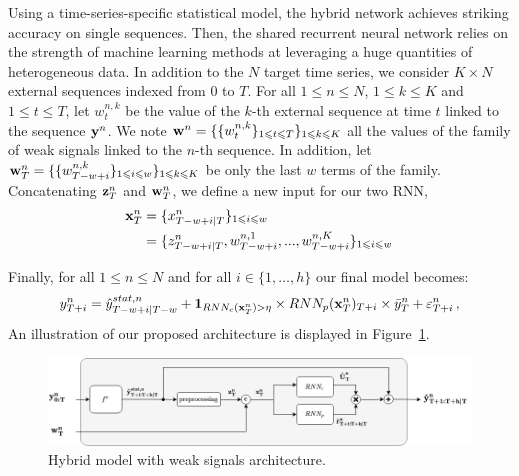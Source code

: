 \documentclass{article} %
\newcommand{\ts}{y}
\newcommand{\fullts}{{\bf \ts}}
\newcommand{\tspred}{\hat{\ts}}
\newcommand{\lag}{h}
\newcommand{\window}{w}
\newcommand{\meants}{\Bar{\ts}}
\newcommand{\rnnwindow}{{\bf \rnn}}
\newcommand{\rnn}{z}
\newcommand{\rnnmodel}{\textsc{rnn}}
\newcommand{\ws}{w}
\newcommand{\fullws}{{\bf \ws}}
\newcommand{\concatinput}{x}
\newcommand{\fullconcatinput}{{ \bf \concatinput}}
\newcommand{\threshold}{\eta}
\newcommand{\predictor}{RNN_p}
\newcommand{\classifier}{RNN_c}
\begin{document}
Using a time-series-specific statistical model, the hybrid network achieves striking accuracy on single sequences. Then, the shared recurrent neural network relies on the strength of machine learning methods at leveraging a huge quantities of heterogeneous data.
In addition to the $N$ target time series, we consider $K \times N$ external sequences indexed from $0$ to $T$. For all $1\leqslant n \leqslant N$, $1\leqslant k \leqslant K$ and  $1\leqslant t \leqslant T$, let $\ws^{n,k}_t$ be the value of the $k$-th external sequence at time $t$ linked to the sequence $\fullts^n$. We note $\fullws^n = \{\{\ws_t^{n,k}\}_{1\leqslant t \leqslant T}\}_{1\leqslant k \leqslant K}$ all the values of the family of weak signals linked to the $n$-th sequence. In addition, let $\fullws^n_T = \{\{\ws_{T-w+i}^{n,k}\}_{1\leqslant i \leqslant \window}\}_{1\leqslant k \leqslant K}$ be only the last $\window$ terms of the family. Concatenating $ \rnnwindow^n_T$ and $\fullws^n_T$, we define a new input for our two RNN,   
\begin{align*}
\fullconcatinput^n_T &= \{\concatinput^n_{T-w+i|T}\}_{1\leqslant i \leqslant w}\, \\
&= \{\rnn^n_{T-w+i|T}, \ws^{n,1}_{T-w+i},...,\ws^{n,K}_{T-w+i}\}_{1\leqslant i \leqslant w}\,
\end{align*}

Finally, for all $1\leqslant n \leqslant N$ and for all $i \in \{1,\ldots,\lag\}$ our final model becomes:
\begin{equation}
\label{eq:full:model}
\ts^n_{T+i}  = \tspred^{stat,n}_{T-w+i|T-w} +  \mathbf{1}_{\classifier(\fullconcatinput^n_T) > \threshold} \times \predictor(\fullconcatinput^n_T)_{T+i} \times \meants^n_T + \varepsilon^n_{T+i}\,,
\end{equation}
An illustration of our proposed architecture is displayed in Figure~\ref{fig:architecture}.

\begin{figure}
  \centering
    \includegraphics[width=1.2\linewidth]{figure/Regime_switching_recurrent_model}
  \caption{Hybrid model with weak signals architecture.}
\label{fig:architecture}
\end{figure}
\end{document}
